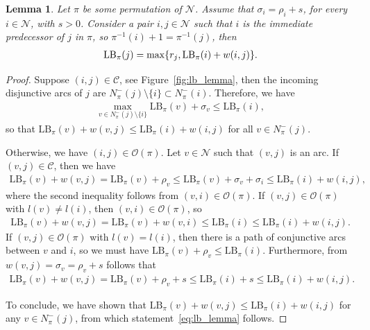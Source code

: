 \documentclass[a4paper]{article}
\theoremstyle{definition}
\theoremstyle{plain}
\newtheorem{lemma}{Lemma}
\begin{document}
\begin{lemma}\label{lb_lemma}
  Let $\pi$ be some permutation of $\mathcal{N}$. Assume that
  $\sigma_{i} = \rho_{i} + s$, for every $i \in \mathcal{N}$, with $s > 0$.
  Consider a pair $i,j \in \mathcal{N}$ such that $i$ is the immediate predecessor
  of $j$ in $\pi$, so $\pi^{-1}(i) + 1 = \pi^{-1}(j)$, then
\begin{align}
  \label{eq:lb_lemma}
  \text{\upshape LB}_\pi(j) = \max \{ r_{j}, \text{\upshape LB}_\pi(i) + w(i, j) \} .
\end{align}
\end{lemma}
\begin{proof}
  Suppose $(i,j) \in \mathcal{C}$, see Figure~\ref{fig:lb_lemma},
  then the incoming disjunctive arcs of $j$ are
  $N^{-}_{\pi}(j) \setminus \{ i \} \subset N^{-}_{\pi}(i)$. Therefore, we have
  \begin{align*}
    \max_{v \in N^{-}_{\pi}(j) \setminus \{i\}} \text{LB}_\pi(v) + \sigma_{v} \leq \text{LB}_\pi(i) ,
  \end{align*}
  so that
      $\text{LB}_\pi(v) + w(v,j) \leq \text{LB}_\pi(i) + w(i,j)$
  for all $v \in N_{\pi}^{-}(j)$.

  Otherwise, we have $(i, j) \in \mathcal{O}(\pi)$.
  Let $v \in \mathcal{N}$ such that $(v, j)$ is an arc.
  If $(v,j) \in \mathcal{C}$, then we have
  \begin{align*}
    \text{LB}_\pi(v) + w(v,j) =
    \text{LB}_\pi(v) + \rho_{v} \leq \text{LB}_\pi(v) + \sigma_{v} + \sigma_{i} \leq \text{LB}_\pi(i) + w(i,j) ,
  \end{align*}
  where the second inequality follows from $(v,i) \in \mathcal{O}(\pi)$.
  If $(v, j) \in \mathcal{O}(\pi)$ with $l(v) \neq l(i)$, then $(v,i) \in \mathcal{O}(\pi)$, so
  \begin{align*}
    \text{LB}_\pi(v) + w(v, j) = \text{LB}_\pi(v) + w(v, i) \leq \text{LB}_\pi(i) \leq \text{LB}_\pi(i) + w(i,j) .
  \end{align*}
  If $(v, j) \in \mathcal{O}(\pi)$ with $l(v) = l(i)$, then there is a path of conjunctive arcs between $v$ and
  $i$, so we must have $\text{LB}_\pi(v) + \rho_{v} \leq \text{LB}_\pi(i)$.
  Furthermore, from $w(v,j) = \sigma_{v} = \rho_{v} + s$ follows that
  \begin{align*}
    \text{LB}_\pi(v) + w(v,j) = \text{LB}_\pi(v) + \rho_{v} + s \leq \text{LB}_\pi(i) + s \leq \text{LB}_\pi(i) + w(i, j) .
  \end{align*}

  To conclude, we have shown that
  $\text{LB}_\pi(v) + w(v,j) \leq \text{LB}_\pi(i) + w(i,j)$ for any
  $v \in N^{-}_{\pi}(j)$, from which statement~\eqref{eq:lb_lemma} follows.
\end{proof}
\end{document}
